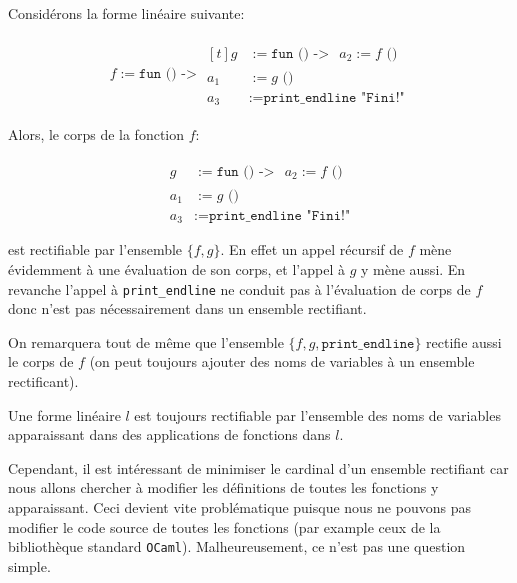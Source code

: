 \begin{example}
    Considérons la forme linéaire suivante:

    \begin{align*}
        f := \texttt{fun () -> } \begin{aligned}[t]
                                     g   & := \texttt{fun () -> } \begin{aligned} a_2 := f \texttt{ ()}\end{aligned} \\
                                     a_1 & := g \texttt{ ()}                                                         \\
                                     a_3 & := \texttt{print\_endline "Fini!"}
                                 \end{aligned}
    \end{align*}

    Alors, le corps de la fonction $f$:

    \begin{align*}
        g   & := \texttt{fun () -> } \begin{aligned} a_2 := f \texttt{ ()}\end{aligned} \\
        a_1 & := g \texttt{ ()}                                                         \\
        a_3 & := \texttt{print\_endline "Fini!"}
    \end{align*}

    est rectifiable par l'ensemble $\{f, g\}$. En effet un appel récursif de $f$
    mène évidemment à une évaluation de son corps, et l'appel à $g$ y mène
    aussi. En revanche l'appel à \texttt{print\_endline} ne conduit pas à
    l'évaluation de corps de $f$ donc n'est pas nécessairement dans un ensemble
    rectifiant.

    On remarquera tout de même que l'ensemble $\{f, g, \texttt{print\_endline}\}$
    rectifie aussi le corps de $f$ (on peut toujours ajouter des noms de
    variables à un ensemble rectificant).
\end{example}

\begin{remark}
    Une forme linéaire $l$ est toujours rectifiable par l'ensemble des noms de
    variables apparaissant dans des applications de fonctions dans $l$.

    Cependant, il est intéressant de minimiser le cardinal d'un ensemble
    rectifiant car nous allons chercher à modifier les définitions de toutes les
    fonctions y apparaissant. Ceci devient vite problématique puisque nous ne
    pouvons pas modifier le code source de toutes les fonctions (par example
    ceux de la bibliothèque standard \texttt{OCaml}). Malheureusement, ce n'est
    pas une question simple.
\end{remark}

